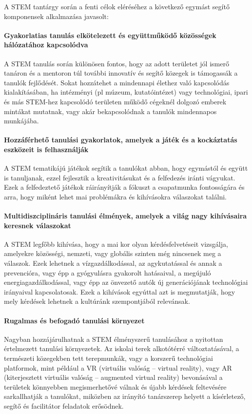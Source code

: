 A STEM tantárgy során a fenti célok eléréséhez a következő egymást segítő
komponensek alkalmazása javasolt:

\paragraph{Gyakorlatias tanulás elkötelezett és együttműködő közösségek
  hálózatához kapcsolódva}
A STEM tanulás során különösen fontos, hogy az adott területet jól ismerő
tanáron és a mentoron túl további innovatív és segítő közegek is támogassák a
tanulók fejlődését. Sokat hozzátehet a mindennapi élethez való kapcsolódás
kialakításában, ha intézményi (pl múzeum, kutatóintézet) vagy technológiai,
ipari és más STEM-hez kapcsolódó területen működő cégeknél dolgozó emberek
mintákat mutatnak, vagy akár bekapcsolódnak a tanulók mindennapos munkájába.

\paragraph{Hozzáférhető tanulási gyakorlatok, amelyek a játék és a kockáztatás
  eszközeit is felhasználják} A STEM tematikájú játékok segítik a tanulókat
abban, hogy egymástól és együtt is tanuljanak, ezzel fejlesztik a
kreativitásukat és a felfedezés iránti vágyukat. Ezek a felfedeztető játékok
ráirányítják a fókuszt a csapatmunka fontosságára és arra, hogy miként lehet
mai problémákra és kihívásokra válaszokat találni.

\paragraph{Multidiszciplináris tanulási élmények, amelyek a világ nagy
  kihívásaira keresnek válaszokat} A STEM legfőbb kihívása, hogy a mai kor olyan
kérdésfelvetéseit vizsgálja, amelyekre közösségi, nemzeti, vagy globális
szinten még nincsenek meg a válaszok. Ezek lehetnek a vízgazdálkodással, az
agykutatással és annak a prevencióra, vagy épp a gyógyulásra gyakorolt
hatásaival, a megújuló energiagazdálkodással, vagy épp az önvezető autók új
generációjának technológiai irányaival kapcsolatosak. Ezek a kihívások egyúttal
azt is megmutatják, hogy mely kérdések lehetnek a kultúránk szempontjából
relevánsak.

\paragraph{Rugalmas és befogadó tanulási környezet} Nagyban hozzájárulhatnak a
STEM élményszerű tanulásához a nyitottan értelmezett tanulási környezetek. Az
iskolai terek alkotótérré változtatásával, a természeti közegekben tett
terepmunkák, vagy a korszerű technológiai platformok, mint például a VR
(virtuális valóság – virtual reality), vagy AR (kiterjesztett virtuális valóság
– augmented virtual reality) bevonásával a területek könnyebben megismerhetővé
válnak és újabb kérdések feltevésére sarkallhatják a tanulókat, miközben az
irányító tanárszerep helyett a kísérletező, segítő és facilitátor feladatok
erősödnek.

